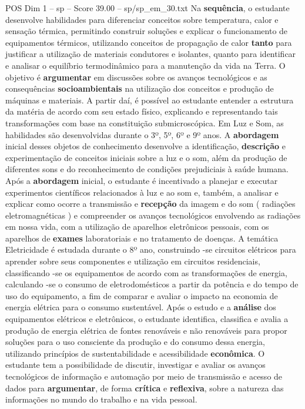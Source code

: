 \begin{textsample}{POS Dim 1 – sp – Score 39.00 – sp/sp\_em\_30.txt}
Na \textbf{sequência}, o estudante desenvolve habilidades para diferenciar conceitos sobre temperatura, calor e sensação térmica, permitindo construir soluções e explicar o funcionamento de equipamentos térmicos, utilizando conceitos de propagação de calor \textbf{tanto} para justificar a utilização de materiais condutores e isolantes, quanto para identificar e analisar o equilíbrio termodinâmico para a manutenção da vida na Terra.
O objetivo é \textbf{argumentar} em discussões sobre os avanços tecnológicos e as consequências \textbf{socioambientais} na utilização dos conceitos e produção de máquinas e materiais.
A partir daí, é possível ao estudante entender a estrutura da matéria de acordo com seu estado físico, explicando e representando tais transformações com base na constituição submicroscópica.
Em Luz e Som, as habilidades são desenvolvidas durante o 3º, 5º, 6º e 9º anos.
A \textbf{abordagem} inicial desses objetos de conhecimento desenvolve a identificação, \textbf{descrição} e experimentação de conceitos iniciais sobre a luz e o som, além da produção de diferentes sons e do reconhecimento de condições prejudiciais à saúde humana.
Após a \textbf{abordagem} inicial, o estudante é incentivado a planejar e executar experimentos científicos relacionados à luz e ao som e, também, a analisar e explicar como ocorre a transmissão e \textbf{recepção} da imagem e do som ( radiações eletromagnéticas ) e compreender os avanços tecnológicos envolvendo as radiações em nossa vida, com a utilização de aparelhos eletrônicos pessoais, com os aparelhos de \textbf{exames} laboratoriais e no tratamento de doenças.
A temática Eletricidade é estudada durante o 8º ano, construindo -se circuitos elétricos para aprender sobre seus componentes e utilização em circuitos residenciais, classificando -se os equipamentos de acordo com as transformações de energia, calculando -se o consumo de eletrodomésticos a partir da potência e do tempo de uso do equipamento, a fim de comparar e avaliar o impacto na economia de energia elétrica para o consumo sustentável.
Após o estudo e a \textbf{análise} dos equipamentos elétricos e eletrônicos, o estudante identifica, classifica e avalia a produção de energia elétrica de fontes renováveis e não renováveis para propor soluções para o uso consciente da produção e do consumo dessa energia, utilizando princípios de sustentabilidade e acessibilidade \textbf{econômica}.
O estudante tem a possibilidade de discutir, investigar e avaliar os avanços tecnológicos de informação e automação por meio de transmissão e acesso de dados para \textbf{argumentar}, de forma \textbf{crítica} e \textbf{reflexiva}, sobre a natureza das informações no mundo do trabalho e na vida pessoal.

\end{textsample}
